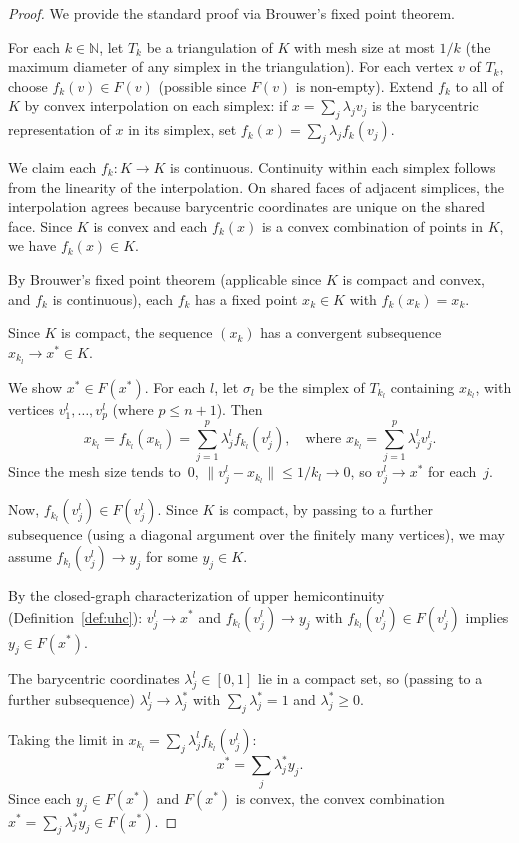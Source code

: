 \documentclass[11pt,a4paper]{article}
\theoremstyle{definition}
\theoremstyle{plain}
\theoremstyle{remark}
\newcommand{\N}{\mathbb{N}}
\begin{document}
\begin{proof}
We provide the standard proof via Brouwer's fixed point theorem.

For each $k \in \N$, let $T_k$ be a triangulation of $K$ with mesh size at most
$1/k$ (the maximum diameter of any simplex in the triangulation). For each vertex $v$
of $T_k$, choose $f_k(v) \in F(v)$ (possible since $F(v)$ is non-empty). Extend
$f_k$ to all of $K$ by convex interpolation on each simplex: if
$x = \sum_{j} \lambda_j v_j$ is the barycentric representation of $x$ in its simplex,
set $f_k(x) = \sum_j \lambda_j f_k(v_j)$.

We claim each $f_k : K \to K$ is continuous. Continuity within each simplex follows
from the linearity of the interpolation. On shared faces of adjacent simplices, the
interpolation agrees because barycentric coordinates are unique on the shared face.
Since $K$ is convex and each $f_k(x)$ is a convex combination of points in $K$,
we have $f_k(x) \in K$.

By Brouwer's fixed point theorem (applicable since $K$ is compact and convex, and
$f_k$ is continuous), each $f_k$ has a fixed point $x_k \in K$ with $f_k(x_k) = x_k$.

Since $K$ is compact, the sequence $(x_k)$ has a convergent subsequence
$x_{k_l} \to x^* \in K$.

We show $x^* \in F(x^*)$. For each $l$, let $\sigma_l$ be the simplex of $T_{k_l}$
containing $x_{k_l}$, with vertices $v_1^l, \ldots, v_p^l$ (where $p \leq n+1$).
Then
\[
    x_{k_l} = f_{k_l}(x_{k_l}) = \sum_{j=1}^p \lambda_j^l f_{k_l}(v_j^l),
    \quad \text{where } x_{k_l} = \sum_{j=1}^p \lambda_j^l v_j^l.
\]
Since the mesh size tends to~0, $\|v_j^l - x_{k_l}\| \leq 1/k_l \to 0$, so
$v_j^l \to x^*$ for each~$j$.

Now, $f_{k_l}(v_j^l) \in F(v_j^l)$. Since $K$ is compact, by passing to a further
subsequence (using a diagonal argument over the finitely many vertices), we may assume
$f_{k_l}(v_j^l) \to y_j$ for some $y_j \in K$.

By the closed-graph characterization of upper hemicontinuity (Definition~\ref{def:uhc}):
$v_j^l \to x^*$ and $f_{k_l}(v_j^l) \to y_j$ with $f_{k_l}(v_j^l) \in F(v_j^l)$
implies $y_j \in F(x^*)$.

The barycentric coordinates $\lambda_j^l \in [0,1]$ lie in a compact set, so
(passing to a further subsequence) $\lambda_j^l \to \lambda_j^*$ with
$\sum_j \lambda_j^* = 1$ and $\lambda_j^* \geq 0$.

Taking the limit in $x_{k_l} = \sum_j \lambda_j^l f_{k_l}(v_j^l)$:
\[
    x^* = \sum_j \lambda_j^* y_j.
\]
Since each $y_j \in F(x^*)$ and $F(x^*)$ is convex, the convex combination
$x^* = \sum_j \lambda_j^* y_j \in F(x^*)$.
\end{proof}
\end{document}
